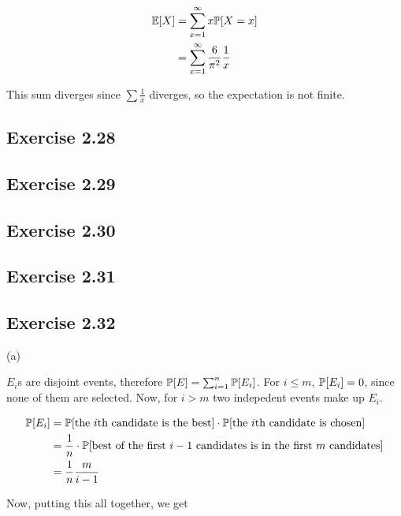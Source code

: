 \begin{equation*}
\begin{split}
\E[X] & = \sum_{x=1}^{\infty} x \P[X = x] \\ 
& = \sum_{x=1}^{\infty} \frac{6}{\pi^2} \frac{1}{x}
\end{split}
\end{equation*}

This sum diverges since $\sum \frac{1}{x}$ diverges, so the expectation is not finite.

\subsection*{Exercise 2.28}

\subsection*{Exercise 2.29}

\subsection*{Exercise 2.30}

\subsection*{Exercise 2.31}

\subsection*{Exercise 2.32}

(a)

$E_i$s are disjoint events, therefore $\P[E] = \sum_{i=1}^{n} \P[E_i]$. For
$i \leq m$, $\P[E_i] = 0$, since none of them are selected. Now, for $i>m$ two indepedent
events make up $E_i$.

\begin{equation*}
\begin{split}
\P[E_i] & = \P[\text{the } i \text{th candidate is the best}] \cdot 
\P[\text{the } i \text{th candidate is chosen}] \\
& = \frac{1}{n} \cdot \P[\text{best of the first } i-1 \text{ candidates is in the first }m \text{ candidates}]\\
& = \frac{1}{n} \frac{m}{i-1}
\end{split}
\end{equation*}

Now, putting this all together, we get

